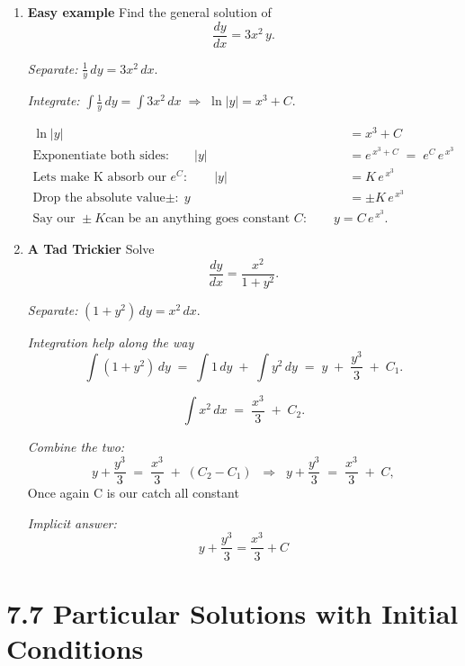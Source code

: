 \documentclass{article}
\begin{document}
\begin{enumerate}
\item \textbf{Easy example}  
Find the general solution of
\[
\frac{dy}{dx}=3x^{2}\,y.
\]

\textit{Separate:}\;
\(\displaystyle\frac{1}{y}\,dy = 3x^{2}\,dx.\)

\textit{Integrate:}\;
\(\displaystyle \int\frac{1}{y}\,dy = \int 3x^{2}\,dx
\;\Rightarrow\;
\ln|y| = x^{3}+C.\)

\begin{align*}
\ln|y| &= x^{3}+C \\[6pt]
\text{Exponentiate both sides:}\qquad 
|y| &= e^{\,x^{3}+C}
      \;=\; e^{C}\,e^{\,x^{3}} \\[6pt]
\text{Lets make K absorb our }e^{C}:\qquad
|y| &= K\,e^{\,x^{3}} \\[6pt]
\text{Drop the absolute value}\pm: \;
y &= \pm K\,e^{\,x^{3}} \\[6pt]
\text{Say our }\pm K\text{can be an anything goes constant }C: \qquad
\boxed{y = C\,e^{\,x^{3}}}.
\end{align*}

\bigskip
\item \textbf{A Tad Trickier}  
Solve
\[
\frac{dy}{dx}=\frac{x^{2}}{1+y^{2}}.
\]

\textit{Separate:}\;
\((1+y^{2})\,dy = x^{2}\,dx.\)

\textit{Integration help along the way}
\[
\int (1 + y^{2})\,dy \;=\; \int 1\,dy \;+\; \int y^{2}\,dy
       \;=\; y \;+\; \frac{y^{3}}{3} \;+\; C_{1}.
\]

\[
\int x^{2}\,dx \;=\; \frac{x^{3}}{3} \;+\; C_{2}.
\]

\textit{Combine the two:}
\[
y + \frac{y^{3}}{3} \;=\; \frac{x^{3}}{3} \;+\; (C_{2} - C_{1})
\;\;\Longrightarrow\;\;
y + \frac{y^{3}}{3} \;=\; \frac{x^{3}}{3} \;+\; C,
\]
Once again C is our catch all constant

\textit{Implicit answer:}\;
\[
\boxed{\,y + \dfrac{y^{3}}{3} = \dfrac{x^{3}}{3} + C\,}
\]


\end{enumerate}

\noindent

\newpage
\section{7.7 Particular Solutions with Initial Conditions}
\end{document}
